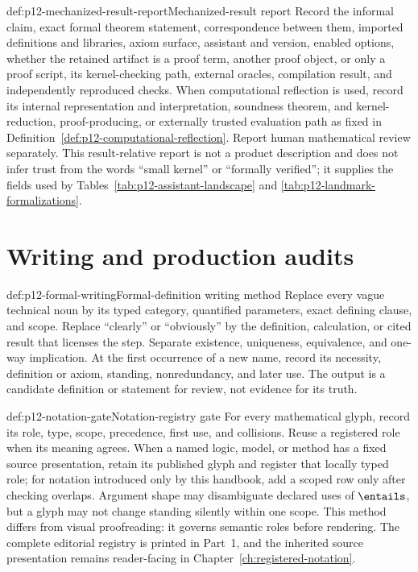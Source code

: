 \begin{hbmethod}{def:p12-mechanized-result-report}{Mechanized-result report}
Record the informal claim, exact formal theorem statement, correspondence
between them, imported definitions and libraries, axiom surface, assistant and
version, enabled options, whether the retained artifact is a proof term,
another proof object, or only a proof script, its kernel-checking path, external
oracles, compilation result, and independently reproduced checks.  When
computational reflection is used, record its internal representation and
interpretation, soundness theorem, and kernel-reduction, proof-producing, or
externally trusted evaluation path as fixed in
Definition~\ref{def:p12-computational-reflection}.  Report human mathematical
review separately.  This result-relative report is not a
product description and does not infer trust from the words “small kernel” or
“formally verified”; it supplies the fields used by
Tables~\ref{tab:p12-assistant-landscape} and
\ref{tab:p12-landmark-formalizations}.
\end{hbmethod}

\section{Writing and production audits}

\begin{hbmethod}{def:p12-formal-writing}{Formal-definition writing method}
Replace every vague technical noun by its typed category, quantified
parameters, exact defining clause, and scope.  Replace “clearly” or “obviously”
by the definition, calculation, or cited result that licenses the step.
Separate existence, uniqueness, equivalence, and one-way implication.  At the
first occurrence of a new name, record its necessity, definition or axiom,
standing, nonredundancy, and later use.  The output is a candidate definition
or statement for review, not evidence for its truth.
\end{hbmethod}

\begin{hbmethod}{def:p12-notation-gate}{Notation-registry gate}
For every mathematical glyph, record its role, type, scope, precedence, first
use, and collisions.  Reuse a registered role when its
meaning agrees.  When a named logic, model, or method has a fixed source
presentation, retain its published glyph and register that locally typed role;
for notation introduced only by this handbook, add a scoped row only after
checking overlaps.  Argument shape may disambiguate declared uses
of \(\entails\), but a glyph may not change standing silently within one scope.
This method differs from visual proofreading: it governs semantic roles before
rendering.  The complete editorial registry is printed in Part~1, and the
inherited source presentation remains reader-facing in
Chapter~\ref{ch:registered-notation}.
\end{hbmethod}

